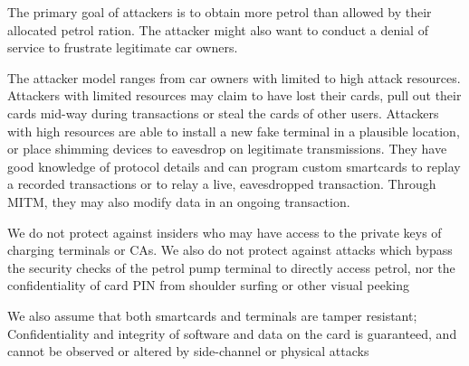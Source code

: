 The primary goal of attackers is to obtain more petrol than allowed by their allocated petrol ration. The attacker might also want to conduct a denial of service to frustrate legitimate car owners.

The attacker model ranges from car owners with limited to high attack resources. Attackers with limited resources may claim to have lost their cards, pull out their cards mid-way during transactions or steal the cards of other users. Attackers with high resources are able to install a new fake terminal in a plausible location, or place shimming devices to eavesdrop on legitimate transmissions. They have good knowledge of protocol details and can program custom smartcards to replay a recorded transactions or to relay a live, eavesdropped transaction. Through MITM, they may also modify data in an ongoing transaction.

We do not protect against insiders who may have access to the private keys of charging terminals or CAs. We also do not protect against attacks which bypass the security checks of the petrol pump terminal to directly access petrol, nor the confidentiality of card PIN from shoulder surfing or other visual peeking

We also assume that both smartcards and terminals are tamper resistant; Confidentiality and integrity of software and data on the card is guaranteed, and cannot be observed or altered by side-channel or physical attacks
